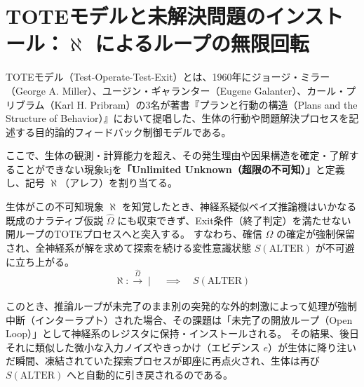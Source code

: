 \section{TOTEモデルと未解決問題のインストール：$\aleph$ によるループの無限回転}

TOTEモデル（Test-Operate-Test-Exit）とは、1960年にジョージ・ミラー（George A. Miller）、ユージン・ギャランター（Eugene Galanter）、カール・プリブラム（Karl H. Pribram）の3名が著書『プランと行動の構造（Plans and the Structure of Behavior）』において提唱した、生体の行動や問題解決プロセスを記述する目的論的フィードバック制御モデルである。

ここで、生体の観測・計算能力を超え、その発生理由や因果構造を確定・了解することができない現象kjを\textbf{「Unlimited Unknown（超限の不可知）」}と定義し、記号 $\aleph$（アレフ）を割り当てる。

生体がこの不可知現象 $\aleph$ を知覚したとき、神経系疑似ベイズ推論機はいかなる既成のナラティブ仮説 $\hat{\Omega}$ にも収束できず、Exit条件（終了判定）を満たせない開ループのTOTEプロセスへと突入する。
すなわち、確信 $\Omega$ の確定が強制保留され、全神経系が解を求めて探索を続ける変性意識状態 $S(\mathrm{ALTER})$ が不可避に立ち上がる。
\begin{equation}
    \aleph :\xrightarrow[]{\hat{\Omega}} \mid \quad \implies \quad S(\mathrm{ALTER})
\end{equation}

このとき、推論ループが未完了のまま別の突発的な外的刺激によって処理が強制中断（インターラプト）された場合、その課題は「未完了の開放ループ（Open Loop）」として神経系のレジスタに保持・インストールされる。
その結果、後日それに類似した微小な入力ノイズやきっかけ（エビデンス $e$）が生体に降り注いだ瞬間、凍結されていた探索プロセスが即座に再点火され、生体は再び $S(\mathrm{ALTER})$ へと自動的に引き戻されるのである。


